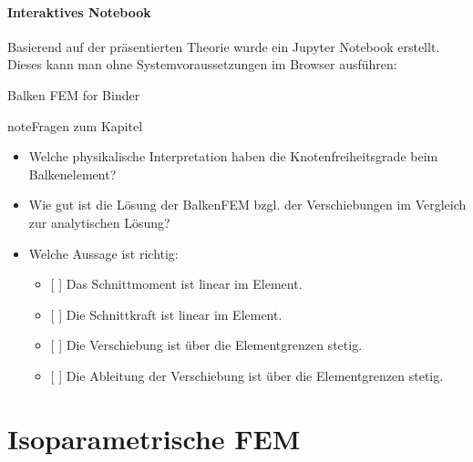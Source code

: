 \documentclass[letterpaper,10pt,german]{jupyterBook}
\begin{document}
\subsection{Interaktives Notebook}
\label{\detokenize{chapters/chapter2/BalkenFEM:interaktives-notebook}}
\sphinxAtStartPar
Basierend auf der präsentierten Theorie wurde ein Jupyter Notebook erstellt. Dieses kann man ohne Systemvoraussetzungen im Browser ausführen:

\sphinxAtStartPar
Balken FEM for Binder 

\begin{sphinxadmonition}{note}{Fragen zum Kapitel}

\sphinxAtStartPar
{}
\begin{itemize}
\item {} 
\sphinxAtStartPar
Welche physikalische Interpretation haben die Knotenfreiheitsgrade beim Balkenelement?

\item {} 
\sphinxAtStartPar
Wie gut ist die Lösung der Balken\sphinxhyphen{}FEM bzgl. der Verschiebungen im Vergleich zur analytischen Lösung?

\item {} 
\sphinxAtStartPar
Welche Aussage ist richtig:
\begin{itemize}
\item {} 
\sphinxAtStartPar
{[} {]} Das Schnittmoment ist linear im Element.

\item {} 
\sphinxAtStartPar
{[} {]} Die Schnittkraft ist linear im Element.

\item {} 
\sphinxAtStartPar
{[} {]} Die Verschiebung ist über die Elementgrenzen stetig.

\item {} 
\sphinxAtStartPar
{[} {]} Die Ableitung der Verschiebung ist über die Elementgrenzen stetig.

\end{itemize}

\end{itemize}
\end{sphinxadmonition}

\sphinxstepscope


\part{Isoparametrische FEM}
\end{document}
